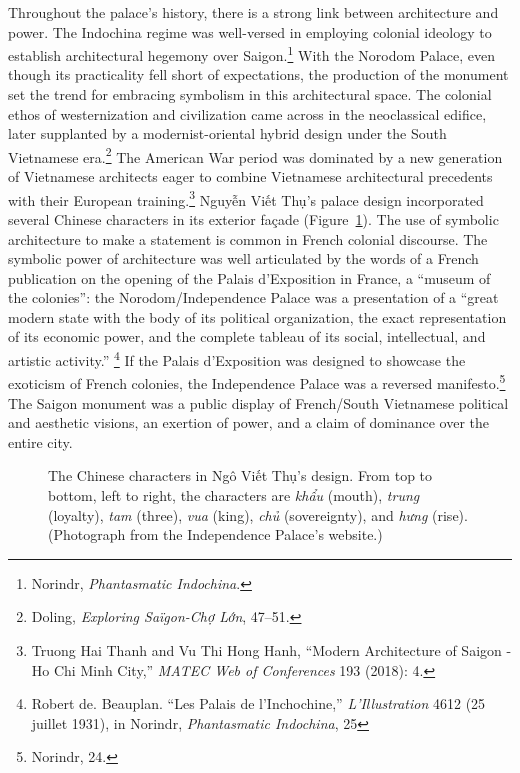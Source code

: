Throughout the palace's history, there is a strong link between architecture and power. The Indochina regime was well-versed in employing colonial ideology to establish architectural hegemony over Saigon.\footnote{Norindr, \textit{Phantasmatic Indochina}.} With the Norodom Palace, even though its practicality fell short of expectations, the production of the monument set the trend for embracing symbolism in this architectural space. The colonial ethos of westernization and civilization came across in the neoclassical edifice, later supplanted by a modernist-oriental hybrid design under the South Vietnamese era.\footnote{Doling, \textit{Exploring Saïgon-Chợ Lớn}, 47–51.} The American War period was dominated by a new generation of Vietnamese architects eager to combine Vietnamese architectural precedents with their European training.\footnote{Truong Hai Thanh and Vu Thi Hong Hanh, “Modern Architecture of Saigon - Ho Chi Minh City,” \textit{MATEC Web of Conferences} 193 (2018): 4.} Nguyễn Viết Thụ’s palace design incorporated several Chinese characters in its exterior façade (Figure~\ref{palace_chinese}). The use of symbolic architecture to make a statement is common in French colonial discourse. The symbolic power of architecture was well articulated by the words of a French publication on the opening of the Palais d’Exposition in France, a “museum of the colonies”: the Norodom/Independence Palace was a presentation of a “great modern state with the body of its political organization, the exact representation of its economic power, and the complete tableau of its social, intellectual, and artistic activity.” \footnote{Robert de. Beauplan. “Les Palais de l’Inchochine,” \textit{L’Illustration} 4612 (25 juillet 1931), in Norindr, \textit{Phantasmatic Indochina}, 25} If the Palais d’Exposition was designed to showcase the exoticism of French colonies, the Independence Palace was a reversed manifesto.\footnote{Norindr, 24.} The Saigon monument was a public display of French/South Vietnamese political and aesthetic visions, an exertion of power, and a claim of dominance over the entire city. \en

\begin{figure}[!ht]
\begin{center}
\vspace{-.2 in}
\caption[\vi Chinese characters in Ngô Viết Thụ's design]{\vi The Chinese characters in Ngô Viết Thụ's design. From top to bottom, left to right, the characters are \textit{khẩu} (mouth), \textit{trung} (loyalty), \textit{tam} (three), \textit{vua} (king), \textit{chủ} (sovereignty), and \textit{hưng} (rise). (Photograph from the Independence Palace's website.\footnotemark) \en}\label{palace_chinese}
\end{center}
\vspace{-.2 in}
\end{figure}

